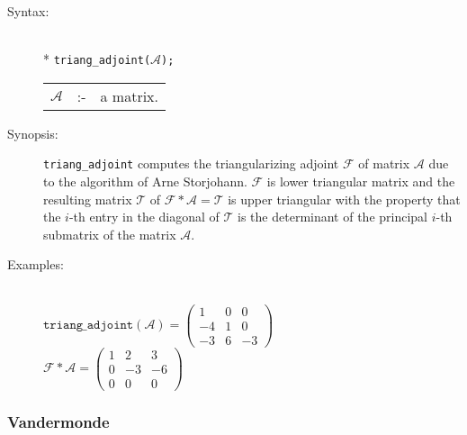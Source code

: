 \begin{description}
\item[Syntax:]\mbox{}\\*
\texttt{triang\_adjoint($\mathcal{A}$);}\\[2mm]
\begin{tabular}{l l l}
$\mathcal{A}$  &:-& a matrix.
\end{tabular}

\item[Synopsis:]

\texttt{triang\_adjoint} computes the triangularizing adjoint $\mathcal{F}$ of
matrix $\mathcal{A}$ due to the algorithm of Arne Storjohann. $\mathcal{F}$ is
lower triangular matrix and the resulting matrix $\mathcal{T}$ of
$\mathcal{F * A = T}$ is upper triangular with the property that the $i$-th
entry in the diagonal of $\mathcal{T}$ is the determinant of the principal
$i$-th submatrix of the matrix $\mathcal{A}$.

\item[Examples:]\mbox{}\\
  \(\texttt{triang\_adjoint}(\mathcal{A}) =
  \begin{pmatrix} 1 & 0 & 0 \\ -4 & 1 & 0 \\ -3 & 6 & -3 \end{pmatrix}\) \\[2mm]
  \(\mathcal{F} * \mathcal{A} =
  \begin{pmatrix} 1 & 2 & 3 \\ 0 & -3 & -6 \\ 0 & 0 & 0 \end{pmatrix}\)
\end{description}

\subsubsection{Vandermonde}
\label{linalg:Vandermonde}

